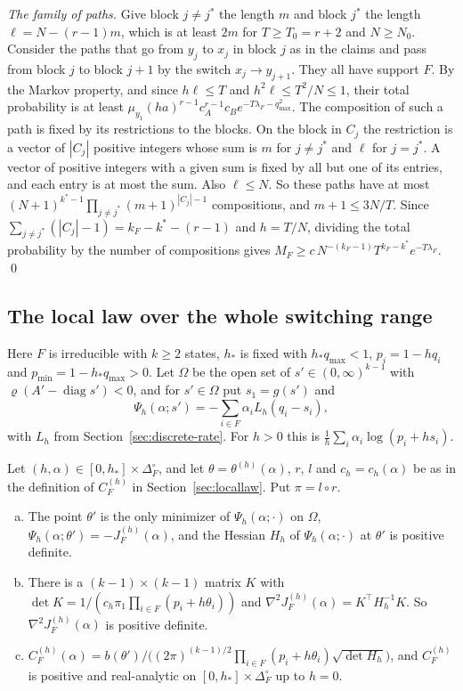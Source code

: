 \emph{The family of paths.} Give block $j\ne j^*$ the length $m$ and block
$j^*$ the length $\ell=N-(r-1)m$, which is at least $2m$ for $T\ge T_0=r+2$
and $N\ge N_0$. Consider the paths that go from $y_j$ to $x_j$ in block $j$
as in the claims and pass from block $j$ to block $j+1$ by the switch
$x_j\to y_{j+1}$. They all have support $F$. By the Markov property, and
since $h\ell\le T$ and $h^2\ell\le T^2/N\le1$, their total probability is at
least $\mu_{y_1}(ha)^{r-1}c_A^{r-1}c_Be^{-T\lambda_F-q_{\max}^2}$. The
composition of such a path is fixed by its restrictions to the blocks. On
the block in $C_j$ the restriction is a vector of $|C_j|$ positive integers
whose sum is $m$ for $j\ne j^*$ and $\ell$ for $j=j^*$. A vector of
positive integers with a given sum is fixed by all but one of its entries,
and each entry is at most the sum. Also $\ell\le N$. So these paths
have at most $(N+1)^{k^*-1}\prod_{j\ne j^*}(m+1)^{|C_j|-1}$ compositions,
and $m+1\le3N/T$. Since $\sum_{j\ne j^*}(|C_j|-1)=k_F-k^*-(r-1)$ and $h=T/N$,
dividing the total probability by the number of compositions gives
$M_F\ge c\,N^{-(k_F-1)}T^{k_F-k^*}e^{-T\lambda_F}$. \qed

\subsection{The local law over the whole switching range}\label{app:full-range}

Here $F$ is irreducible with $k\ge2$ states, $h_*$ is fixed with $h_*q_{\max}<1$,
$p_i=1-hq_i$ and $p_{\min}=1-h_*q_{\max}>0$. Let $\Omega$ be the open set of
$s'\in(0,\infty)^{k-1}$ with $\varrho(A'-\operatorname{diag}s')<0$, and for
$s'\in\Omega$ put $s_1=g(s')$ and
\[
\Psi_h(\alpha;s')=-\sum_{i\in F}\alpha_iL_h(q_i-s_i),
\]
with $L_h$ from Section~\ref{sec:discrete-rate}. For $h>0$ this is
$\frac1h\sum_i\alpha_i\log(p_i+hs_i)$.

\begin{lemma}\label{lem:discrete-hessian}
Let $(h,\alpha)\in[0,h_*]\times\Delta_F^\circ$, and let $\theta=\theta^{(h)}(\alpha)$,
$r$, $l$ and $c_h=c_h(\alpha)$ be as in the definition of $C^{(h)}_F$ in
Section~\ref{sec:locallaw}. Put $\pi=l\circ r$.
\begin{enumerate}[(a)]
\item The point $\theta'$ is the only minimizer of $\Psi_h(\alpha;\cdot)$ on $\Omega$,
$\Psi_h(\alpha;\theta')=-J^{(h)}_F(\alpha)$, and the Hessian $H_h$ of
$\Psi_h(\alpha;\cdot)$ at $\theta'$ is positive definite.
\item There is a $(k-1)\times(k-1)$ matrix $K$ with
$\det K=1/(c_h\pi_1\prod_{i\in F}(p_i+h\theta_i))$ and
$\nabla^2J^{(h)}_F(\alpha)=K^\top H_h^{-1}K$. So $\nabla^2J^{(h)}_F(\alpha)$ is positive
definite.
\item $C^{(h)}_F(\alpha)=b(\theta')/\bigl((2\pi)^{(k-1)/2}\prod_{i\in F}(p_i+h\theta_i)\sqrt{\det H_h}\bigr)$,
and $C^{(h)}_F$ is positive and real-analytic on $[0,h_*]\times\Delta_F^\circ$ up to
$h=0$.
\end{enumerate}
\end{lemma}

